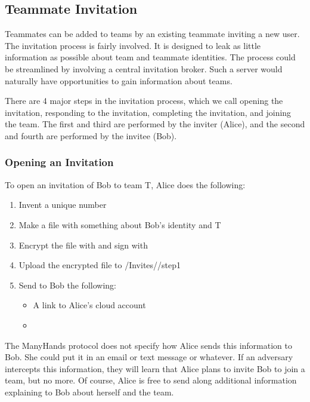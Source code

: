 \documentclass[pldi-cameraready,10pt]{sigplanconf-pldi16}
\begin{document}
\subsection{Teammate Invitation}

Teammates can be added to teams by an existing teammate inviting a new user.
The invitation process is fairly involved.
It is designed to leak as little information as possible about team and teammate identities.
The process could be streamlined by involving a central invitation broker.
Such a server would naturally have opportunities to gain information about teams.

There are 4 major steps in the invitation process, which we call opening the invitation, responding to the invitation, completing the invitation, and joining the team.
The first and third are performed by the inviter (Alice), and the second and fourth are performed by the invitee (Bob).

\subsubsection{Opening an Invitation}

To open an invitation of Bob to team T, Alice does the following:

\begin{enumerate}
\item Invent a unique number 
\item Make a file with something about Bob's identity and T
\item Encrypt the file with  and sign with 
\item Upload the encrypted file to \slash Invites\slash {}\slash step1
\item Send to Bob the following:
  \begin{itemize}
  \item A link to Alice's cloud account
  \item {}
  \end{itemize}
\end{enumerate}

The ManyHands protocol does not specify how Alice sends this information to Bob.
She could put it in an email or text message or whatever.
If an adversary intercepts this information, they will learn that Alice plans to invite Bob to join a team, but no more.
Of course, Alice is free to send along additional information explaining to Bob about herself and the team.
\end{document}
